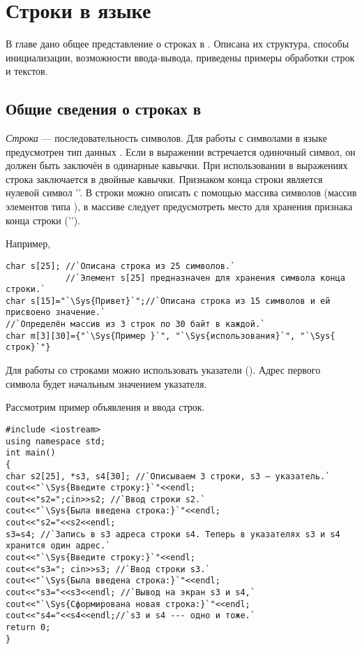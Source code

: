 \chapter[Строки в языке \Sys{C++}]{Строки в языке }\label{ch08}
В главе дано общее представление о строках в . Описана их структура, способы инициализации, возможности ввода-вывода,
приведены примеры обработки строк и текстов.

\section[Общие сведения о строках в \Sys{C++}]{Общие сведения о строках в }\label{ch08:1}
\emph{Строка} --- последовательность символов. Для работы с символами в языке  предусмотрен
тип данных . Если в выражении встречается одиночный символ, он должен быть заключён в одинарные
кавычки. При использовании в выражениях строка заключается в двойные кавычки. Признаком конца строки является нулевой
символ ''. В  строки можно описать с помощью массива символов (массив
элементов типа ), в массиве следует предусмотреть место для хранения признака конца строки
('').

Например, 
\begin{lstlisting}
char s[25]; //`Описана строка из 25 символов.`
            //`Элемент s[25] предназначен для хранения символа конца строки.`
char s[15]="`\Sys{Привет}`";//`Описана строка из 15 символов и ей присвоено значение.`
//`Определён массив из 3 строк по 30 байт в каждой.`
char m[3][30]={"`\Sys{Пример }`", "`\Sys{использования}`", "`\Sys{ строк}`"} 
\end{lstlisting}

Для работы со строками можно использовать указатели (). Адрес первого символа будет начальным
значением указателя.

Рассмотрим пример объявления и ввода строк.
\begin{lstlisting}
#include <iostream>
using namespace std;
int main()
{
char s2[25], *s3, s4[30]; //`Описываем 3 строки, s3 — указатель.`
cout<<"`\Sys{Введите строку:}`"<<endl;
cout<<"s2=";cin>>s2; //`Ввод строки s2.`
cout<<"`\Sys{Была введена строка:}`"<<endl;
cout<<"s2="<<s2<<endl;
s3=s4; //`Запись в s3 адреса строки s4. Теперь в указателях s3 и s4 хранится один адрес.`
cout<<"`\Sys{Введите строку:}`"<<endl;
cout<<"s3="; cin>>s3; //`Ввод строки s3.`
cout<<"`\Sys{Была введена строка:}`"<<endl;
cout<<"s3="<<s3<<endl; //`Вывод на экран s3 и s4,`
cout<<"`\Sys{Сформирована новая строка:}`"<<endl;
cout<<"s4="<<s4<<endl;//`s3 и s4 --- одно и тоже.`
return 0;
}
\end{lstlisting}

